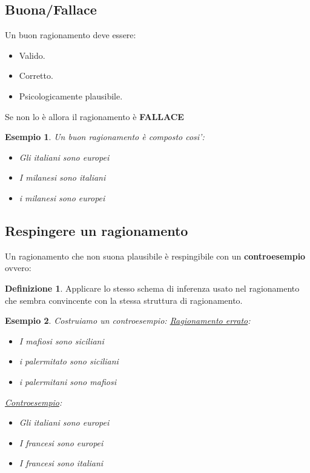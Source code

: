 \documentclass{article}
\newtheorem{exmp}{Esempio}[section]
\theoremstyle{definition}
\newtheorem{definition}{Definizione}[section]
\begin{document}
\subsection{Buona/Fallace}
Un buon ragionamento deve essere:
\begin{itemize}
        \item Valido.
        \item Corretto.
        \item Psicologicamente plausibile.
\end{itemize}
Se non lo è allora il ragionamento è \textbf{FALLACE} 
\begin{exmp}
        Un buon ragionamento è composto cosi':
        \begin{itemize}
                \item Gli italiani sono europei
                \item I milanesi sono italiani
                \item i milanesi sono europei
        \end{itemize}
\end{exmp}



\subsection{Respingere un ragionamento}
Un ragionamento che non suona plausibile è respingibile con un \textbf{controesempio} ovvero: \par
\begin{definition}
        Applicare lo stesso schema di inferenza usato nel ragionamento che sembra convincente con la stessa struttura di ragionamento.
\end{definition}
\begin{exmp}
        Costruiamo un controesempio: \newline
        \underline{Ragionamento errato}:
        \begin{itemize}
                \item I mafiosi sono siciliani
                \item i palermitato sono siciliani
                \item i palermitani sono mafiosi
        \end{itemize}

        \underline{Controesempio}:
        \begin{itemize}
                \item Gli italiani sono europei
                \item I francesi sono europei
                \item I francesi sono italiani 
        \end{itemize}
\end{exmp}
\end{document}
